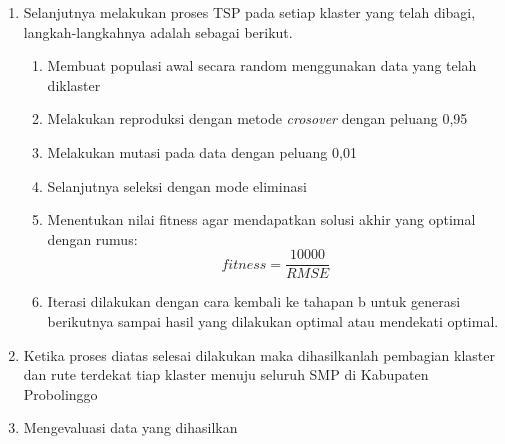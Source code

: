 \begin{enumerate}
	\item Selanjutnya melakukan proses TSP pada setiap klaster yang telah dibagi, langkah-langkahnya adalah sebagai berikut.
	\begin{enumerate}
	    \item Membuat populasi awal secara random menggunakan data yang telah diklaster
	    \item Melakukan reproduksi dengan metode \textit{crosover} dengan peluang 0,95
	    \item Melakukan mutasi pada data dengan peluang 0,01
	    \item Selanjutnya seleksi dengan mode eliminasi
	    \item Menentukan nilai fitness agar mendapatkan solusi akhir yang optimal dengan rumus:
	    \begin{equation}
	    fitness=\frac{10000}{RMSE}
	    \end{equation}
	    \item Iterasi dilakukan dengan cara kembali ke tahapan b untuk generasi berikutnya sampai hasil yang dilakukan optimal atau mendekati optimal.
    \end{enumerate}
	\item Ketika proses diatas selesai dilakukan maka dihasilkanlah pembagian klaster dan rute terdekat tiap klaster menuju seluruh SMP di Kabupaten Probolinggo
	\item Mengevaluasi data yang dihasilkan
\end{enumerate}